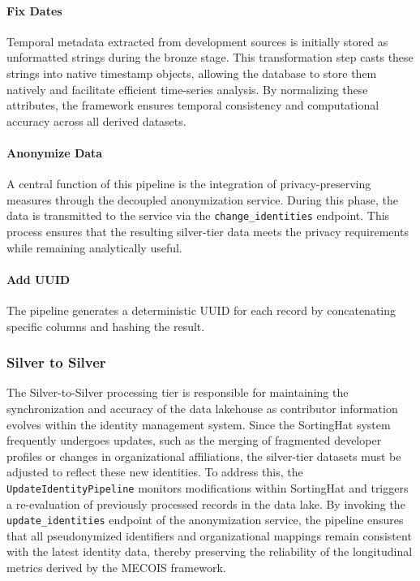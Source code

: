 \paragraph{Fix Dates} Temporal metadata extracted from development sources is initially stored as unformatted strings during the bronze stage. This transformation step casts these strings into native timestamp objects, allowing the database to store them natively and facilitate efficient time-series analysis. By normalizing these attributes, the framework ensures temporal consistency and computational accuracy across all derived datasets.

\paragraph{Anonymize Data}
A central function of this pipeline is the integration of privacy-preserving measures through the decoupled anonymization service. During this phase, the data is transmitted to the service via the \texttt{change\_identities} endpoint. This process ensures that the resulting silver-tier data meets the privacy requirements while remaining analytically useful.

\paragraph{Add UUID}
The pipeline generates a deterministic \ac{UUID} for each record by concatenating specific columns and hashing the result.

\subsubsection{Silver to Silver}
\label{subsubsec:silver2silver}

The Silver-to-Silver processing tier is responsible for maintaining the synchronization and accuracy of the data lakehouse as contributor information evolves within the identity management system. Since the SortingHat system frequently undergoes updates, such as the merging of fragmented developer profiles or changes in organizational affiliations, the silver-tier datasets must be adjusted to reflect these new identities. To address this, the \texttt{UpdateIdentityPipeline} monitors modifications within SortingHat and triggers a re-evaluation of previously processed records in the data lake. By invoking the \texttt{update\_identities} endpoint of the anonymization service, the pipeline ensures that all pseudonymized identifiers and organizational mappings remain consistent with the latest identity data, thereby preserving the reliability of the longitudinal metrics derived by the MECOIS framework.

